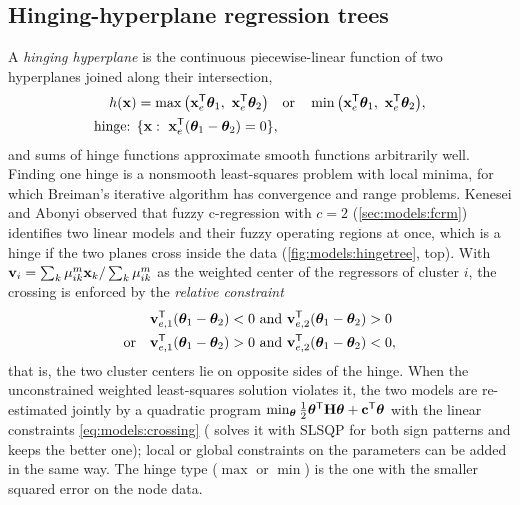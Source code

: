 \subsection{Hinging-hyperplane regression trees}\label{sec:models:hinge}

A \emph{hinging hyperplane} \cite{breiman:1993:hinge} is the continuous piecewise-linear function of two hyperplanes joined along their intersection,
\begin{equation}
  \begin{aligned}
  h(\mathbf{x})&=\max\big(\mathbf{x}_e\T\boldsymbol\theta_1,\ \mathbf{x}_e\T\boldsymbol\theta_2\big)\quad\text{or}\quad
  \min\big(\mathbf{x}_e\T\boldsymbol\theta_1,\ \mathbf{x}_e\T\boldsymbol\theta_2\big),\\
  \text{hinge: }&\{\mathbf{x}:\ \mathbf{x}_e\T(\boldsymbol\theta_1-\boldsymbol\theta_2)=0\},
  \end{aligned}
  \label{eq:models:hinge}
\end{equation}
and sums of hinge functions approximate smooth functions arbitrarily well. Finding one hinge is a nonsmooth least-squares problem with local minima, for which Breiman's iterative algorithm has convergence and range problems. Kenesei and Abonyi \cite{kenesei:2013:hinge} observed that fuzzy c-regression with $c=2$ (\cref{sec:models:fcrm}) identifies two linear models and their fuzzy operating regions at once, which is a hinge if the two planes cross inside the data (\cref{fig:models:hingetree}, top). With $\mathbf{v}_i=\sum_k\mu_{ik}^m\mathbf{x}_k/\sum_k\mu_{ik}^m$ as the weighted center of the regressors of cluster $i$, the crossing is enforced by the \emph{relative constraint}
\begin{equation}
  \begin{aligned}
  &\mathbf{v}_{e,1}\T(\boldsymbol\theta_1-\boldsymbol\theta_2)<0 \ \text{and}\ \mathbf{v}_{e,2}\T(\boldsymbol\theta_1-\boldsymbol\theta_2)>0\\
  \text{or}\quad &\mathbf{v}_{e,1}\T(\boldsymbol\theta_1-\boldsymbol\theta_2)>0 \ \text{and}\ \mathbf{v}_{e,2}\T(\boldsymbol\theta_1-\boldsymbol\theta_2)<0,
  \end{aligned}
  \label{eq:models:crossing}
\end{equation}
that is, the two cluster centers lie on opposite sides of the hinge. When the unconstrained weighted least-squares solution violates it, the two models are re-estimated jointly by a quadratic program $\min_{\boldsymbol\theta}\tfrac12\boldsymbol\theta^{\mathsf{T}}\mathbf{H}\boldsymbol\theta+\mathbf{c}^{\mathsf{T}}\boldsymbol\theta$ with the linear constraints \eqref{eq:models:crossing} ( solves it with SLSQP for both sign patterns and keeps the better one); local or global constraints on the parameters can be added in the same way. The hinge type ($\max$ or $\min$) is the one with the smaller squared error on the node data.

